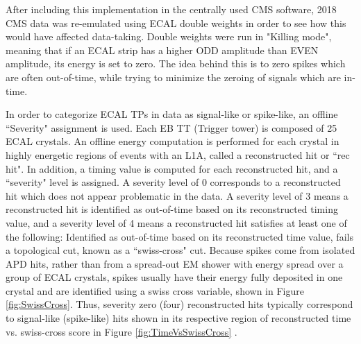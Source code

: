 After including this implementation in the centrally used CMS software, 2018 CMS data was re-emulated using ECAL double weights in order to see how this would have affected data-taking. Double weights were run in "Killing mode", meaning that if an ECAL strip has a higher ODD amplitude than EVEN amplitude, its energy is set to zero. The idea behind this is to zero spikes which are often out-of-time, while trying to minimize the zeroing of signals which are in-time. 

In order to categorize ECAL TPs in data as signal-like or spike-like, an offline ``Severity" assignment is used. Each EB TT (Trigger tower) is composed of 25 ECAL crystals. An offline energy computation is performed for each crystal in highly energetic regions of events with an L1A, called a reconstructed hit or ``rec hit". In addition, a timing value is computed for each reconstructed hit, and a ``severity" level is assigned. A severity level of 0 corresponds to a reconstructed hit which does not appear problematic in the data. A severity level of 3 means a reconstructed hit is identified as out-of-time based on its reconstructed timing value, and a severity level of 4 means a reconstructed hit satisfies at least one of the following: Identified as out-of-time based on its reconstructed time value, fails a topological cut, known as a ``swiss-cross" cut. Because spikes come from isolated APD hits, rather than from a spread-out EM shower with energy spread over a group of ECAL crystals, spikes usually have their energy fully deposited in one crystal and are identified using a swiss cross variable, shown in Figure \ref{fig:SwissCross}. Thus, severity zero (four) reconstructed hits typically correspond to signal-like (spike-like) hits shown in its respective region of reconstructed time vs. swiss-cross score in Figure \ref{fig:TimeVsSwissCross} \cite{CMS-DP-2012-008, CMS-DP-2012-008_Plots}. 

